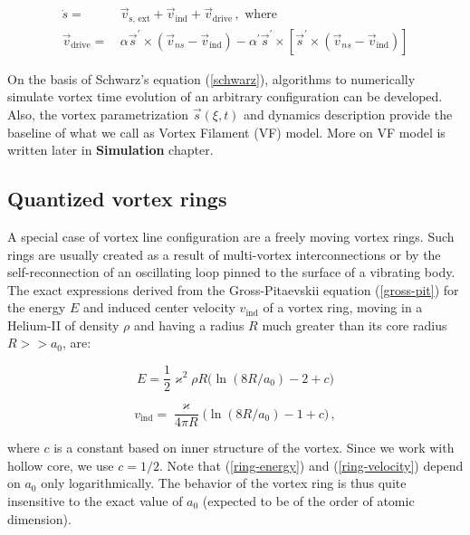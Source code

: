 \begin{align}
\dot{s} =& \,\vec{v}_{\text{s, ext}} + \vec{v}_{\text{ind}} + \vec{v}_{\text{drive}}
\,,\,\, \text{where}
\label{schwarz}
\\
\vec{v}_{\text{drive}} =& \,\alpha\vec{s}^{\prime} \times (\vec{v}_{ns} - \vec{v}_{\text{ind}})
- \alpha^{\prime}\vec{s}^{\prime} \times [\vec{s}^{\prime} \times (\vec{v}_{ns} - \vec{v}_{\text{ind}})]
\label{drive}
\end{align}

On the basis of Schwarz's equation (\ref{schwarz}), algorithms to numerically simulate vortex time evolution of an arbitrary configuration can be developed. Also, the vortex parametrization $\vec{s}(\xi, t)$ and dynamics description provide the baseline of what we call as Vortex Filament (VF) model. More on VF model is written later in \textbf{Simulation} chapter.



\subsection*{Quantized vortex rings}

A special case of vortex line configuration are a freely moving vortex rings. Such rings are usually created as a result of multi-vortex interconnections \cite{vortex_ring} or by the self-reconnection of an oscillating loop pinned to the surface of a vibrating body. The exact expressions derived from the Gross-Pitaevskii equation (\ref{gross-pit}) \cite{roberts} for the energy $E$ and induced center velocity $v_{\text{ind}}$ of a vortex ring, moving in a Helium-II of density $\rho$ and having a radius $R$ much greater than its core radius $R >> a_0$, are:

\begin{equation}
E = \frac{1}{2}\varkappa^2 \rho R \Big(\ln(8R/a_0) - 2 + c\Big)
\label{ring-energy}
\end{equation}

\begin{equation}
v_{\text{ind}} = \frac{\varkappa}{4\pi R} \Big(\ln(8R/a_0) - 1 + c\Big)\,,
\label{ring-velocity}
\end{equation}

where $c$ is a constant based on inner structure of the vortex. Since we work with hollow core, we use \cite{donnelly_book}
$c = 1/2$. Note that (\ref{ring-energy}) and (\ref{ring-velocity}) depend on $a_0$ only logarithmically.
The behavior of the vortex ring is thus quite insensitive to the exact value of $a_0$ (expected to be of the order of atomic dimension).

